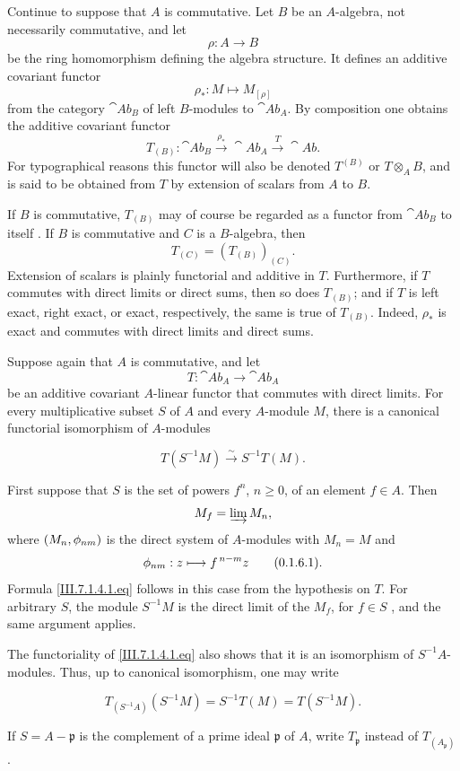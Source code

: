 \begin{env}[7.1.3]
\label{III.7.1.3}
Continue to suppose that $A$ is commutative.  Let $B$ be an
$A$-algebra, not necessarily commutative, and let
\[
  \rho:A\longrightarrow B
\]
be the ring homomorphism defining the algebra structure.  It
defines an
additive covariant functor
\[
  \rho_*:M\longmapsto M_{[\rho]}
\]
from the category $\cat{Ab}_B$ of left $B$-modules to
$\cat{Ab}_A$.  By composition one obtains the additive
covariant functor
\[
  T_{(B)}:
  \cat{Ab}_B
  \xrightarrow{\rho_*}
  \cat{Ab}_A
  \xrightarrow{T}
  \cat{Ab}.
\]
For typographical reasons this functor will also be denoted
$T^{(B)}$ or $T\otimes_AB$, and is said to be obtained from $T$
by extension of scalars from $A$ to $B$.

If $B$ is commutative, $T_{(B)}$ may of course be regarded as a
functor from $\cat{Ab}_B$ to itself .  If $B$ is
commutative and $C$ is a $B$-algebra, then
\[
  T_{(C)}=(T_{(B)})_{(C)}.
\]
Extension of scalars is plainly functorial and additive in
$T$.  Furthermore, if $T$ commutes with direct limits or direct
sums, then so does $T_{(B)}$; and if $T$ is left exact, right
exact, or exact, respectively, the same is true of $T_{(B)}$.
Indeed, $\rho_*$ is exact and commutes with direct limits and
direct sums.
\end{env}

\begin{env}[7.1.4]
\label{III.7.1.4}
Suppose again that $A$ is commutative, and let
\[
  T:\cat{Ab}_A\longrightarrow\cat{Ab}_A
\]
be an additive covariant $A$-linear functor that commutes with
direct limits.  For every multiplicative subset $S$ of $A$ and
every $A$-module $M$, there is a canonical functorial
isomorphism of $A$-modules
\begin{env}[7.1.4.1]
\label{III.7.1.4.1}
\[
  T(S^{-1}M)
  \xrightarrow{\sim}
  S^{-1}T(M).
  \tag{7.1.4.1}\label{III.7.1.4.1.eq}
\]
\end{env}

First suppose that $S$ is the set of powers $f^n$,
$n\geq0$, of an element $f\in A$.  Then
\[
  M_f=\varinjlim M_n,
\]
where $(M_n,\vphi_{nm})$ is the direct system of $A$-modules
with $M_n=M$ and
\[
  \vphi_{nm}:z\longmapsto f^{\,n-m}z
  \qquad\text{\sref[0]{0.1.6.1}}.
\]
Formula \eqref{III.7.1.4.1.eq} follows in this case from the
hypothesis on $T$.  For arbitrary $S$, the module $S^{-1}M$ is
the direct limit of the $M_f$, for $f\in S$
, and the same argument applies.

The functoriality of \eqref{III.7.1.4.1.eq} also shows that it
is an isomorphism of $S^{-1}A$-modules.  Thus, up to canonical
isomorphism, one may write
\begin{env}[7.1.4.2]
\label{III.7.1.4.2}
\[
  T_{(S^{-1}A)}(S^{-1}M)
  =
  S^{-1}T(M)
  =
  T(S^{-1}M).
  \tag{7.1.4.2}\label{III.7.1.4.2.eq}
\]
\end{env}
If $S=A-\mathfrak p$ is the complement of a prime ideal
$\mathfrak p$ of $A$, write $T_{\mathfrak p}$ instead of
$T_{(A_{\mathfrak p})}$.
\end{env}

